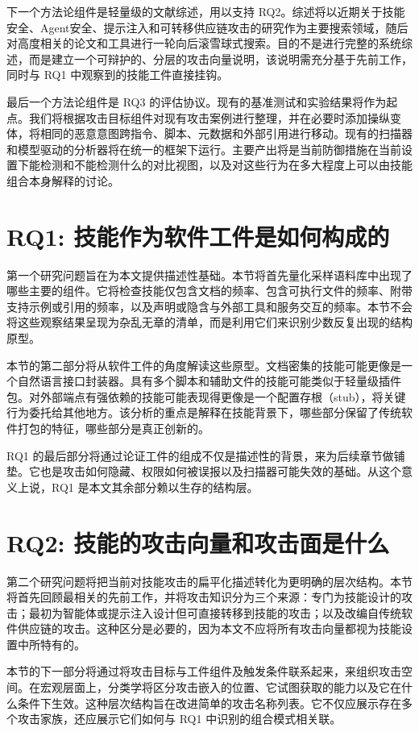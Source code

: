 \documentclass[conference]{IEEEtran}
\begin{document}
下一个方法论组件是轻量级的文献综述，用以支持 RQ2。综述将以近期关于技能安全、Agent安全、提示注入和可转移供应链攻击的研究作为主要搜索领域，随后对高度相关的论文和工具进行一轮向后滚雪球式搜索。目的不是进行完整的系统综述，而是建立一个可辩护的、分层的攻击向量说明，该说明需充分基于先前工作，同时与 RQ1 中观察到的技能工件直接挂钩。

最后一个方法论组件是 RQ3 的评估协议。现有的基准测试和实验结果将作为起点。我们将根据攻击目标组件对现有攻击案例进行整理，并在必要时添加操纵变体，将相同的恶意意图跨指令、脚本、元数据和外部引用进行移动。现有的扫描器和模型驱动的分析器将在统一的框架下运行。主要产出将是当前防御措施在当前设置下能检测和不能检测什么的对比视图，以及对这些行为在多大程度上可以由技能组合本身解释的讨论。

\section{RQ1: 技能作为软件工件是如何构成的}

第一个研究问题旨在为本文提供描述性基础。本节将首先量化采样语料库中出现了哪些主要的组件。它将检查技能仅包含文档的频率、包含可执行文件的频率、附带支持示例或引用的频率，以及声明或隐含与外部工具和服务交互的频率。本节不会将这些观察结果呈现为杂乱无章的清单，而是利用它们来识别少数反复出现的结构原型。

本节的第二部分将从软件工件的角度解读这些原型。文档密集的技能可能更像是一个自然语言接口封装器。具有多个脚本和辅助文件的技能可能类似于轻量级插件包。对外部端点有强依赖的技能可能表现得更像是一个配置存根（stub），将关键行为委托给其他地方。该分析的重点是解释在技能背景下，哪些部分保留了传统软件打包的特征，哪些部分是真正创新的。

RQ1 的最后部分将通过论证工件的组成不仅是描述性的背景，来为后续章节做铺垫。它也是攻击如何隐藏、权限如何被误报以及扫描器可能失效的基础。从这个意义上说，RQ1 是本文其余部分赖以生存的结构层。

\section{RQ2: 技能的攻击向量和攻击面是什么}

第二个研究问题将把当前对技能攻击的扁平化描述转化为更明确的层次结构。本节将首先回顾最相关的先前工作，并将攻击知识分为三个来源：专门为技能设计的攻击；最初为智能体或提示注入设计但可直接转移到技能的攻击；以及改编自传统软件供应链的攻击。这种区分是必要的，因为本文不应将所有攻击向量都视为技能设置中所特有的。

本节的下一部分将通过将攻击目标与工件组件及触发条件联系起来，来组织攻击空间。在宏观层面上，分类学将区分攻击嵌入的位置、它试图获取的能力以及它在什么条件下生效。这种层次结构旨在改进简单的攻击名称列表。它不仅应展示存在多个攻击家族，还应展示它们如何与 RQ1 中识别的组合模式相关联。
\end{document}

